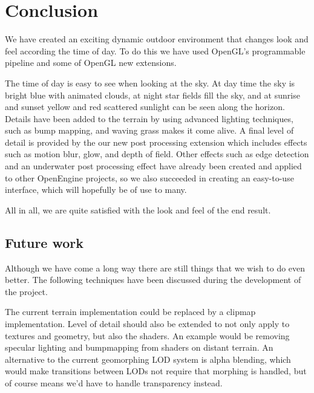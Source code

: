 
\chapter{Conclusion}

We have created an exciting dynamic outdoor environment that changes
look and feel according the time of day. To do this we have used
OpenGL's programmable pipeline and some of OpenGL new extensions.

The time of day is easy to see when looking at the sky. At day time
the sky is bright blue with animated clouds, at night star fields fill
the sky, and at sunrise and sunset yellow and red scattered sunlight
can be seen along the horizon.
%
Details have been added to the terrain by using advanced lighting
techniques, such as bump mapping, and waving grass makes it come alive.
%
A final level of detail is provided by the our new post processing
extension which includes effects such as motion blur, glow, and depth of
field. Other effects such as edge detection and an underwater post
processing effect have already been created and applied to other
OpenEngine projects, so we also succeeded in creating an easy-to-use
interface, which will hopefully be of use to many.

All in all, we are quite satisfied with the look and feel of the end
result.








\section{Future work}

Although we have come a long way there are still things that we wish
to do even better. The following techniques have been discussed during
the development of the project.

The current terrain implementation could be replaced by a clipmap
implementation. Level of detail should also be extended to not only
apply to textures and geometry, but also the shaders. An example would
be removing specular lighting and bumpmapping from shaders on distant
terrain. An alternative to the current geomorphing LOD system is
alpha blending, which would make transitions between LODs not require
that morphing is handled, but of course means we'd have to handle
transparency instead.

